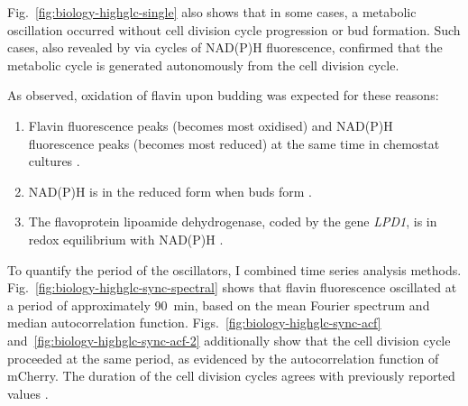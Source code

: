 Fig.\ \ref{fig:biology-highglc-single} also shows that in some cases, a metabolic oscillation occurred without cell division cycle progression or bud formation.
Such cases, also revealed by \textcite{papagiannakisAutonomousMetabolicOscillations2017} via cycles of NAD(P)H fluorescence, confirmed that the metabolic cycle is generated autonomously from the cell division cycle.

As observed, oxidation of flavin upon budding was expected for these reasons:
\begin{enumerate}
  \item Flavin fluorescence peaks (becomes most oxidised) and NAD(P)H fluorescence peaks (becomes most reduced) at the same time in chemostat cultures \parencite{murrayRedoxRegulationRespiring2011}.
  \item NAD(P)H is in the reduced form when buds form \parencite{papagiannakisAutonomousMetabolicOscillations2017}.
  \item The flavoprotein lipoamide dehydrogenase, coded by the gene \textit{LPD1}, is in redox equilibrium with NAD(P)H \parencite{sianoNADHFlavinFluorescence1989}.
\end{enumerate}

To quantify the period of the oscillators, I combined time series analysis methods.
Fig.\ \ref{fig:biology-highglc-sync-spectral} shows that flavin fluorescence oscillated at a period of approximately \SI{90}{\minute}, based on the mean Fourier spectrum and median autocorrelation function.
Figs.\ \ref{fig:biology-highglc-sync-acf} and~\ref{fig:biology-highglc-sync-acf-2} additionally show that the cell division cycle proceeded at the same period, as evidenced by the autocorrelation function of mCherry.
The duration of the cell division cycles agrees with previously reported values \parencite{herskowitzLifeCycleBudding1988}.

